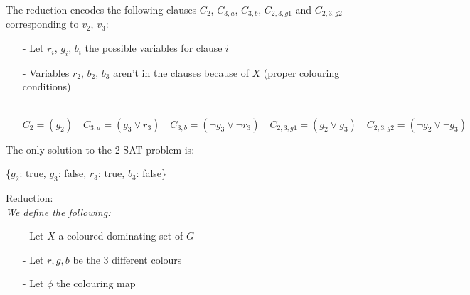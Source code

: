 \documentclass{article}
\begin{document}
\begin{enumerate}[(a)]
\begin{center}
    \end{center}
    The reduction encodes the following clauses $C_{2}$, $C_{3,a}$, $C_{3,b}$, $C_{2,3,g1}$ and $C_{2,3,g2}$ corresponding to $v_2$, $v_3$: 
    \begin{itemize}
        \item[-] Let $r_i$, $g_i$, $b_i$ the possible variables for clause $i$
        \item[-] Variables $r_2$, $b_2$, $b_3$ aren't in the clauses because of $X$ (proper colouring conditions)
        \item[-] $C_2 = (g_2) \quad C_{3,a} = (g_3 \vee r_3) \quad C_{3,b} = (\lnot g_3 \vee \lnot r_3) \quad C_{2,3,g1}= (g_2 \vee g_3) \quad C_{2,3,g2}=(\lnot g_2 \vee \lnot g_3)$ 
    \end{itemize}
    The only solution to the 2-SAT problem is:
    \begin{center}
        \{$g_2$: true, $g_3$: false, $r_3$: true, $b_3$: false\}
    \end{center}
    \begin{center}
    \end{center}    
    \underline{Reduction:}\\   
    \emph{We define the following:}
    \begin{itemize}
        \item[-] Let $X$ a coloured dominating set of $G$
        \item[-] Let $r, g, b$ be the 3 different colours
        \item[-] Let $\phi$ the colouring map

\end{itemize}
\end{enumerate}
\end{document}
